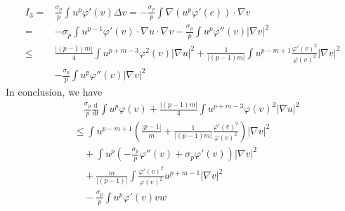 \documentclass[12pt,]{article}
\begin{document}
\begin{equation}
  \begin{aligned}
    I_3=&\frac{\sigma_{p}}{p}\int u^p\varphi'(v)\Delta v = -\frac{\sigma_{p}}{p}\int \nabla(u^p\varphi'(c))\cdot\nabla v\\
    =&-\sigma_{p}\int u^{p-1}\varphi'(v)\cdot \nabla u\cdot\nabla v -\frac{\sigma_{p}}{p} \int u^p\varphi''(v)|\nabla v|^2\\
    \leqslant & \frac{|(p-1)m|}{4}\int u^{p+m-3}\varphi^2(v)|\nabla u |^{2}+\frac{1}{|(p-1)m|}\int u^{p-m+1}\frac{\varphi'(v)^2}{\varphi(v)^2}|\nabla v|^2\\
    &-\frac{\sigma_{p}}{p} \int u^p\varphi''(v)|\nabla v|^2
  \end{aligned}
\end{equation}
In conclusion, we have
\begin{equation}
  \begin{aligned}
    &\quad\frac{\sigma_{p}}{p}\frac{\mathrm{d}}{\mathrm{d} t} \int u^{p} \varphi(v) +  \frac{|(p-1)m|}{4}\int u^{p+m-3}\varphi(v)^2|\nabla u| ^2 \\
    &\leqslant \int u^{p-m+1}\left(\frac{|p-1|}{m}+\frac{1}{|(p-1)m|}\frac{\varphi'(v)^2}{\varphi(v)^2}\right)|\nabla v|^2\\
    &\quad + \int u^p\left(-\frac{\sigma_{p}}{p}\varphi''(v)+\sigma_{p}\varphi'(v)\right)|\nabla v|^2\\
    &\quad +\frac{m}{|(p-1)|}\int \frac{\varphi'(v)^2}{\varphi(v)^2}u^{p+m-1}|\nabla v|^2\\
    &\quad - \frac{\sigma_{p}}{p}\int u^p\varphi'(v)vw
  \end{aligned}
\end{equation}



% 
\end{document}
